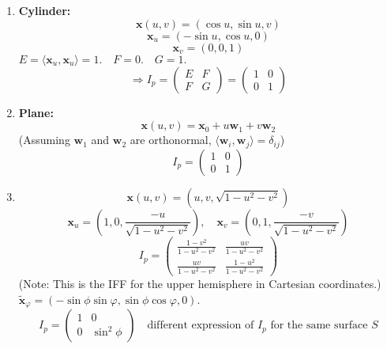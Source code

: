\documentclass{article}
\begin{document}
\begin{example}
\begin{enumerate}
    \item \textbf{Cylinder:}
    \[
    \mathbf{x}(u, v) = (\cos u, \sin u, v)
    \]
    \[
    \mathbf{x}_u = (-\sin u, \cos u, 0)
    \]
    \[
    \mathbf{x}_v = (0, 0, 1)
    \]
    $E = \langle \mathbf{x}_u, \mathbf{x}_u \rangle = 1. \quad F = 0. \quad G = 1.$
    \[
    \Rightarrow I_p = \begin{pmatrix} E & F \\ F & G \end{pmatrix} = \begin{pmatrix} 1 & 0 \\ 0 & 1 \end{pmatrix}
    \]

    \item \textbf{Plane:}
    \[
    \mathbf{x}(u, v) = \mathbf{x}_0 + u \mathbf{w}_1 + v \mathbf{w}_2
    \]
    (Assuming $\mathbf{w}_1$ and $\mathbf{w}_2$ are orthonormal, $\langle \mathbf{w}_i, \mathbf{w}_j \rangle = \delta_{ij}$)
    \[
    I_p = \begin{pmatrix} 1 & 0 \\ 0 & 1 \end{pmatrix}
    \]

    \item
    \[
    \mathbf{x}(u, v) = (u, v, \sqrt{1-u^2-v^2})
    \]
    \[
    \mathbf{x}_u = \left( 1, 0, \frac{-u}{\sqrt{1-u^2-v^2}} \right), \quad \mathbf{x}_v = \left( 0, 1, \frac{-v}{\sqrt{1-u^2-v^2}} \right)
    \]
    \[
    I_p = \begin{pmatrix}
        \frac{1-v^2}{1-u^2-v^2} & \frac{uv}{1-u^2-v^2} \\
        \frac{uv}{1-u^2-v^2} & \frac{1-u^2}{1-u^2-v^2}
    \end{pmatrix}
    \]
    (Note: This is the IFF for the upper hemisphere in Cartesian coordinates.)
    $\mathbf{\tilde{x}}_\varphi = (-\sin \phi \sin \varphi, \sin \phi \cos \varphi, 0)$.
\[
I_p = \begin{pmatrix} 1 & 0 \\ 0 & \sin^2 \phi \end{pmatrix} \quad \text{different expression of } I_p \text{ for the same surface } S
\]
\end{enumerate}
\end{example}
\end{document}
